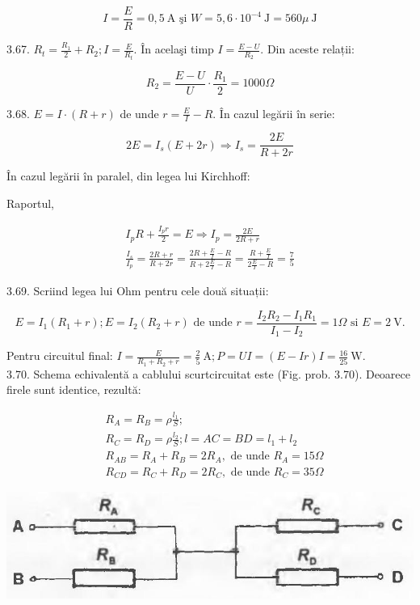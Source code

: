 \documentclass[10pt]{article}
\begin{document}
$$
I=\frac{E}{R}=0,5 \mathrm{~A} \text { şi } W=5,6 \cdot 10^{-4} \mathrm{~J}=560 \mu \mathrm{~J}
$$

3.67. $R_{t}=\frac{R_{1}}{2}+R_{2} ; I=\frac{E}{R_{t}}$. În acelaşi timp $I=\frac{E-U}{R_{2}}$. Din aceste relații:

$$
R_{2}=\frac{E-U}{U} \cdot \frac{R_{1}}{2}=1000 \Omega
$$

3.68. $E=I \cdot(R+r)$ de unde $r=\frac{E}{I}-R$. În cazul legării în serie:

$$
2 E=I_{s}(E+2 r) \Rightarrow I_{s}=\frac{2 E}{R+2 r}
$$

În cazul legării în paralel, din legea lui Kirchhoff:

Raportul,

$$
\begin{gathered}
I_{p} R+\frac{I_{p} r}{2}=E \Rightarrow I_{p}=\frac{2 E}{2 R+r} \\
\frac{I_{s}}{I_{p}}=\frac{2 R+r}{R+2 r}=\frac{2 R+\frac{E}{I}-R}{R+2 \frac{E}{I}-R}=\frac{R+\frac{E}{I}}{2 \frac{E}{I}-R}=\frac{7}{5}
\end{gathered}
$$

3.69. Scriind legea lui Ohm pentru cele două situații:

$$
E=I_{1}\left(R_{1}+r\right) ; E=I_{2}\left(R_{2}+r\right) \text { de unde } r=\frac{I_{2} R_{2}-I_{1} R_{1}}{I_{1}-I_{2}}=1 \Omega \text { si } E=2 \mathrm{~V} .
$$

Pentru circuitul final: $I=\frac{E}{R_{1}+R_{2}+r}=\frac{2}{5} \mathrm{~A} ; P=U I=(E-I r) I=\frac{16}{25} \mathrm{~W}$.\\
3.70. Schema echivalentă a cablului scurtcircuitat este (Fig. prob. 3.70). Deoarece firele sunt identice, rezultă:

$$
\begin{aligned}
& R_{A}=R_{B}=\rho \frac{l_{1}}{S} ; \\
& R_{C}=R_{D}=\rho \frac{l_{2}}{S} ; l=A C=B D=l_{1}+l_{2} \\
& R_{A B}=R_{A}+R_{B}=2 R_{A}, \text { de unde } R_{A}=15 \Omega \\
& R_{C D}=R_{C}+R_{D}=2 R_{C}, \text { de unde } R_{C}=35 \Omega
\end{aligned}
$$

\begin{center}
\includegraphics[max width=\textwidth]{2025_07_01_5b3ff9fa0d508c8e9f17g-354}
\end{center}
\end{document}
